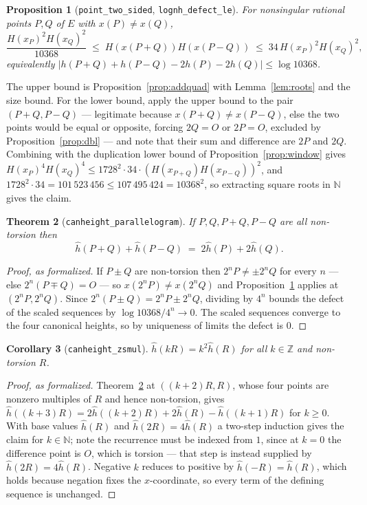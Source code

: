 \documentclass[11pt,reqno]{amsart}
\theoremstyle{plain}
\newtheorem{theorem}{Theorem}[section]
\newtheorem{proposition}[theorem]{Proposition}
\newtheorem{corollary}[theorem]{Corollary}
\theoremstyle{definition}
\theoremstyle{remark}
\DeclareRobustCommand{\lt}[1]{\texttt{#1}}
\newcommand{\hh}{\widehat{h}}
\newcommand{\nh}{H}
\begin{document}
\begin{proposition}[\lt{point\_two\_sided}, \lt{lognh\_defect\_le}]\label{prop:quasi}
For nonsingular rational points $P,Q$ of $E$ with $x(P) \ne x(Q)$,
\[
  \frac{\nh(x_P)^2\nh(x_Q)^2}{10368} \;\le\;
  \nh\!\left(x(P{+}Q)\right)\nh\!\left(x(P{-}Q)\right) \;\le\;
  34\,\nh(x_P)^2\nh(x_Q)^2,
\]
equivalently
$\lvert h(P{+}Q) + h(P{-}Q) - 2h(P) - 2h(Q)\rvert \le \log 10368$.
\end{proposition}

The upper bound is Proposition~\ref{prop:addquad} with
Lemma~\ref{lem:roots} and the size bound. For the lower bound, apply the
upper bound to the pair $(P{+}Q, P{-}Q)$ --- legitimate because
$x(P{+}Q) \ne x(P{-}Q)$, else the two points would be equal or opposite,
forcing $2Q = O$ or $2P = O$, excluded by Proposition~\ref{prop:dbl} --- and
note that their sum and difference are $2P$ and $2Q$. Combining with the
duplication lower bound of Proposition~\ref{prop:window} gives
$\nh(x_P)^4\nh(x_Q)^4 \le 1728^2 \cdot 34 \cdot
(\nh(x_{P+Q})\nh(x_{P-Q}))^2$, and $1728^2 \cdot 34 = 101\,523\,456 \le
107\,495\,424 = 10368^2$, so extracting square roots in $\mathbb{N}$ gives
the claim.

\begin{theorem}[\lt{canheight\_parallelogram}]\label{thm:par}
If $P, Q, P{+}Q, P{-}Q$ are all non-torsion then
\[
  \hh(P+Q) + \hh(P-Q) \;=\; 2\hh(P) + 2\hh(Q).
\]
\end{theorem}

\begin{proof}[Proof, as formalized]
If $P{\pm}Q$ are non-torsion then $2^nP \ne \pm 2^nQ$ for every $n$ --- else
$2^n(P \mp Q) = O$ --- so $x(2^nP) \ne x(2^nQ)$ and
Proposition~\ref{prop:quasi} applies at $(2^nP, 2^nQ)$. Since
$2^n(P \pm Q) = 2^nP \pm 2^nQ$, dividing by $4^n$ bounds the defect of the
scaled sequences by $\log 10368/4^n \to 0$. The scaled sequences converge to
the four canonical heights, so by uniqueness of limits the defect is $0$.
\end{proof}

\begin{corollary}[\lt{canheight\_zsmul}]\label{cor:mult}
$\hh(kR) = k^2\hh(R)$ for all $k \in \mathbb{Z}$ and non-torsion $R$.
\end{corollary}

\begin{proof}[Proof, as formalized]
Theorem~\ref{thm:par} at $((k{+}2)R, R)$, whose four points are nonzero
multiples of $R$ and hence non-torsion, gives
$\hh((k{+}3)R) = 2\hh((k{+}2)R) + 2\hh(R) - \hh((k{+}1)R)$ for $k \ge 0$.
With base values $\hh(R)$ and $\hh(2R) = 4\hh(R)$ a two-step induction gives
the claim for $k \in \mathbb{N}$; note the recurrence must be indexed from
$1$, since at $k = 0$ the difference point is $O$, which is torsion --- that
step is instead supplied by $\hh(2R) = 4\hh(R)$. Negative $k$ reduces to
positive by $\hh(-R) = \hh(R)$, which holds because negation fixes the
$x$-coordinate, so every term of the defining sequence is unchanged.
\end{proof}
\end{document}
